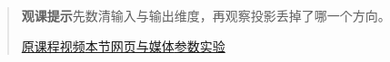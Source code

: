 \begin{quote}\small\textbf{观课提示}\quad 先数清输入与输出维度，再观察投影丢掉了哪一个方向。

\href{https://www.youtube.com/watch?v=v8VSDg_WQlA}{原课程视频}\quad\href{https://vitael04213.github.io/3blue1brown-notes/lessons/nonsquare-matrices.html}{本节网页与媒体}\quad\href{https://vitael04213.github.io/3blue1brown-notes/lab.html\#spatial}{参数实验}
\end{quote}
